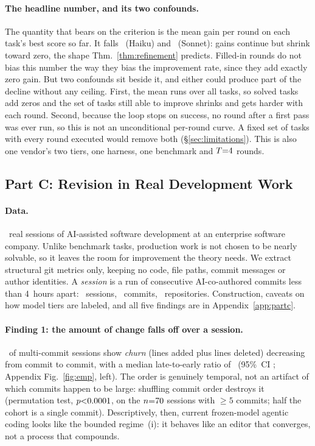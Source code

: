 \documentclass{article}
\theoremstyle{remark}
\theoremstyle{plain}
\begin{document}
\paragraph{The headline number, and its two confounds.} The quantity that bears on the criterion is the mean gain per round on each task's best score so far. It falls \statPBHaikuEta\ (Haiku) and \statPBSonnetEta\ (Sonnet): gains continue but shrink toward zero, the shape Thm.~\ref{thm:refinement} predicts. Filled-in rounds do not bias this number the way they bias the improvement rate, since they add exactly zero gain. But two confounds sit beside it, and either could produce part of the decline without any ceiling. First, the mean runs over all tasks, so solved tasks add zeros and the set of tasks still able to improve shrinks and gets harder with each round. Second, because the loop stops on success, no round after a first pass was ever run, so this is not an unconditional per-round curve. A fixed set of tasks with every round executed would remove both (\S\ref{sec:limitations}). This is also one vendor's two tiers, one harness, one benchmark and $T{=}4$ rounds.

\subsection{Part C: Revision in Real Development Work}
\label{sec:partC}

\paragraph{Data.} \statPCSessions\ real sessions of AI-assisted software development at an enterprise software company. Unlike benchmark tasks, production work is not chosen to be nearly solvable, so it leaves the room for improvement the theory needs. We extract structural git metrics only, keeping no code, file paths, commit messages or author identities. A \emph{session} is a run of consecutive AI-co-authored commits less than 4~hours apart: \statPCSessions\ sessions, \statPCCommits\ commits, \statPCRepos\ repositories. Construction, caveats on how model tiers are labeled, and all five findings are in Appendix~\ref{app:partc}.

\paragraph{Finding 1: the amount of change falls off over a session.} \statPCDecayPct\ of multi-commit sessions show \emph{churn} (lines added plus lines deleted) decreasing from commit to commit, with a median late-to-early ratio of \statPCMedianRatio\ (95\%~CI \statPCPermCI; Appendix Fig.~\ref{fig:emp}, left). The order is genuinely temporal, not an artifact of which commits happen to be large: shuffling commit order destroys it (permutation test, $p{<}0.0001$, on the $n{=}70$ sessions with ${\ge}5$ commits; half the cohort is a single commit). Descriptively, then, current frozen-model agentic coding looks like the bounded regime~(i): it behaves like an editor that converges, not a process that compounds.
\end{document}
